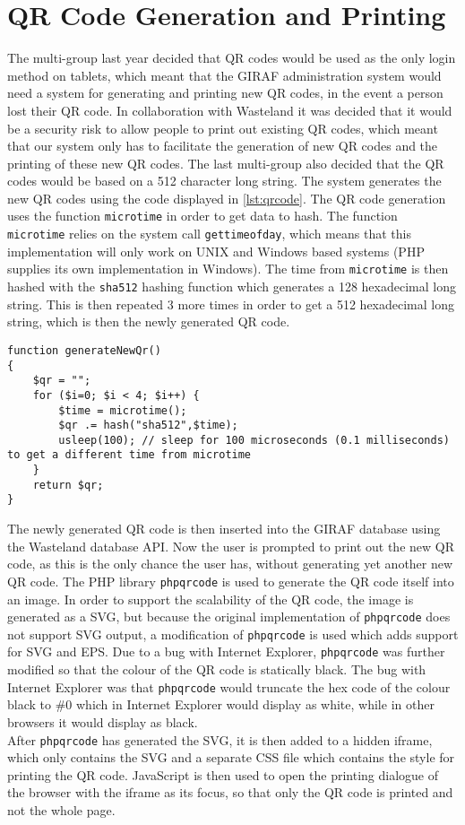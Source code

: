 \section{QR Code Generation and Printing}
\label{sec:qr}
The multi-group last year decided that QR codes would be used as the only login method on tablets, which meant that the GIRAF administration system would need a system for generating and printing new QR codes, in the event a person lost their QR code. In collaboration with Wasteland it was decided that it would be a security risk to allow people to print out existing QR codes, which meant that our system only has to facilitate the generation of new QR codes and the printing of these new QR codes. The last multi-group also decided that the QR codes would be based on a 512 character long string. The system generates the new QR codes using the code displayed in \autoref{lst:qrcode}. The QR code generation uses the function \texttt{microtime} in order to get data to hash. The function \texttt{microtime} relies on the system call \texttt{gettimeofday}, which means that this implementation will only work on UNIX and Windows based systems (PHP supplies its own implementation in Windows). The time from \texttt{microtime} is then hashed with the \texttt{sha512} hashing function which generates a 128 hexadecimal long string. This is then repeated 3 more times in order to get a 512 hexadecimal long string, which is then the newly generated QR code.

\begin{lstlisting}[firstline=1,caption={QR Code Generation},label=lst:qrcode]
function generateNewQr()
{
	$qr = "";
	for ($i=0; $i < 4; $i++) { 
		$time = microtime();
		$qr .= hash("sha512",$time);
		usleep(100); // sleep for 100 microseconds (0.1 milliseconds) to get a different time from microtime
	}
	return $qr;
}
\end{lstlisting}

The newly generated QR code is then inserted into the GIRAF database using the Wasteland database API. Now the user is prompted to print out the new QR code, as this is the only chance the user has, without generating yet another new QR code. The PHP library \texttt{phpqrcode}\citep{phpqrcode} is used to generate the QR code itself into an image. In order to support the scalability of the QR code, the image is generated as a SVG, but because the original implementation of \texttt{phpqrcode} does not support SVG output, a modification of \texttt{phpqrcode} is used\citep{phpqrcodet0k4rt} which adds support for SVG and EPS. Due to a bug with Internet Explorer, \texttt{phpqrcode} was further modified so that the colour of the QR code is statically black. The bug with Internet Explorer was that \texttt{phpqrcode} would truncate the hex code of the colour black to \#0 which in Internet Explorer would display as white, while in other browsers it would display as black. \\
After \texttt{phpqrcode} has generated the SVG, it is then added to a hidden iframe, which only contains the SVG and a separate CSS file which contains the style for printing the QR code. JavaScript is then used to open the printing dialogue of the browser with the iframe as its focus, so that only the QR code is printed and not the whole page.
